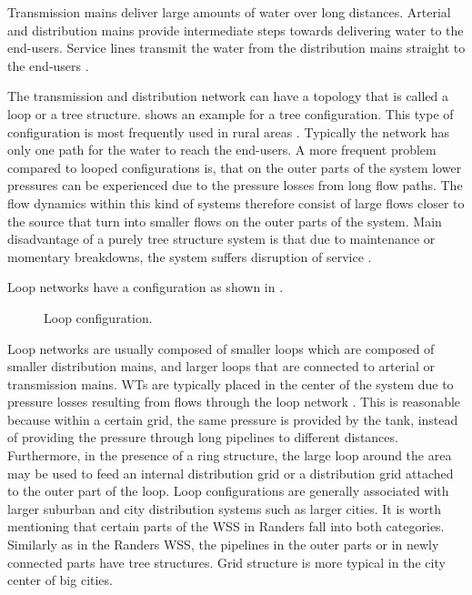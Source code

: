 \vspace{-3mm}

Transmission mains deliver large amounts of water over long distances. Arterial and distribution mains provide intermediate steps towards delivering water to the end-users. Service lines transmit the water from the distribution mains straight to the end-users \cite{grigg2012water}.

The transmission and distribution network can have a topology that is called a loop or a tree structure.  shows an example for a tree configuration. This type of configuration is most frequently used in rural areas \cite{mays}. Typically the network has only one path for the water to reach the end-users. A more frequent problem compared to looped configurations is, that on the outer parts of the system lower pressures can be experienced due to the pressure losses from long flow paths. The flow dynamics within this kind of systems therefore consist of large flows closer to the source that turn into smaller flows on the outer parts of the system. Main disadvantage of a purely tree structure system is that due to maintenance or momentary breakdowns, the system suffers disruption of service \cite{mays}. 

Loop networks have a configuration as shown in . 

\begin{figure}[H]
\centering
 
\caption{Loop configuration.}
\label{fig:loop_configuration}
\end{figure}

\vspace{-3mm}

Loop networks are usually composed of smaller loops which are composed of smaller distribution mains, and larger loops that are connected to arterial or transmission mains. WTs are typically placed in the center of the system due to pressure losses resulting from flows through the loop network \cite{council2007drinking}. This is reasonable because within a certain grid, the same pressure is provided by the tank, instead of providing the pressure through long pipelines to different distances. Furthermore, in the presence of a ring structure, the large loop around the area may be used to feed an internal distribution grid or a distribution grid attached to the outer part of the loop. Loop configurations are generally associated with larger suburban and city distribution systems such as larger cities\cite{council2007drinking}. It is worth mentioning that certain parts of the WSS in Randers fall into both categories. Similarly as in the Randers WSS, the pipelines in the outer parts or in newly connected parts have tree structures. Grid structure is more typical in the city center of big cities. 

